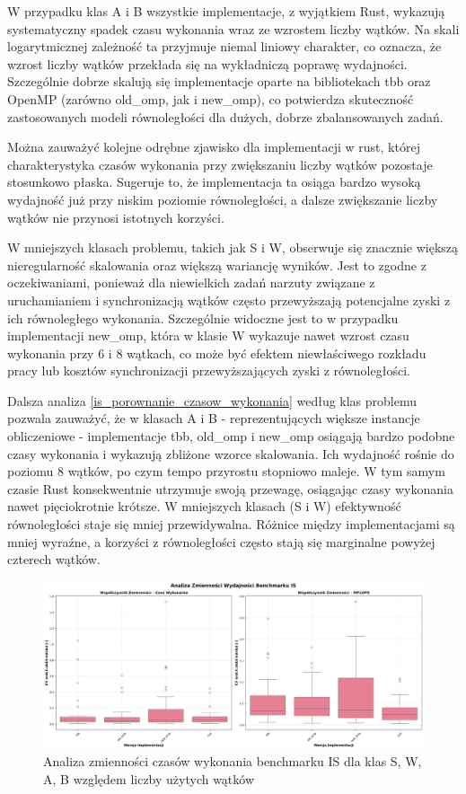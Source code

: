 W przypadku klas A i B wszystkie implementacje, z wyjątkiem Rust, wykazują systematyczny spadek czasu wykonania wraz ze wzrostem liczby wątków. Na skali logarytmicznej zależność ta przyjmuje niemal liniowy charakter, co oznacza, że wzrost liczby wątków przekłada się na wykładniczą poprawę wydajności. Szczególnie dobrze skalują się implementacje oparte na bibliotekach tbb oraz OpenMP (zarówno old\_omp, jak i new\_omp), co potwierdza skuteczność zastosowanych modeli równoległości dla dużych, dobrze zbalansowanych zadań.

Można zauważyć kolejne odrębne zjawisko dla implementacji w rust, której charakterystyka czasów wykonania przy zwiększaniu liczby wątków pozostaje stosunkowo płaska. Sugeruje to, że implementacja ta osiąga bardzo wysoką wydajność już przy niskim poziomie równoległości, a dalsze zwiększanie liczby wątków nie przynosi istotnych korzyści.

W mniejszych klasach problemu, takich jak S i W, obserwuje się znacznie większą nieregularność skalowania oraz większą wariancję wyników. Jest to zgodne z oczekiwaniami, ponieważ dla niewielkich zadań narzuty związane z uruchamianiem i synchronizacją wątków często przewyższają potencjalne zyski z ich równoległego wykonania. Szczególnie widoczne jest to w przypadku implementacji new\_omp, która w klasie W wykazuje nawet wzrost czasu wykonania przy 6 i 8 wątkach, co może być efektem niewłaściwego rozkładu pracy lub kosztów synchronizacji przewyższających zyski z równoległości.

Dalsza analiza \ref{is_porownanie_czasow_wykonania} według klas problemu pozwala zauważyć, że w klasach A i B - reprezentujących większe instancje obliczeniowe - implementacje tbb, old\_omp i new\_omp osiągają bardzo podobne czasy wykonania i wykazują zbliżone wzorce skalowania. Ich wydajność rośnie do poziomu 8 wątków, po czym tempo przyrostu stopniowo maleje. W tym samym czasie Rust konsekwentnie utrzymuje swoją przewagę, osiągając czasy wykonania nawet pięciokrotnie krótsze. W mniejszych klasach (S i W) efektywność równoległości staje się mniej przewidywalna. Różnice między implementacjami są mniej wyraźne, a korzyści z równoległości często stają się marginalne powyżej czterech wątków.

\begin{figure}[H]
    \centering
    \includegraphics[width=\textwidth]{analiza/images/parallel/is/arm/is_analiza_zmiennosci.png}
    \caption{Analiza zmienności czasów wykonania benchmarku IS dla klas S, W, A, B względem liczby użytych wątków}
    \label{is_analiza_zmiennosci}
\end{figure}

